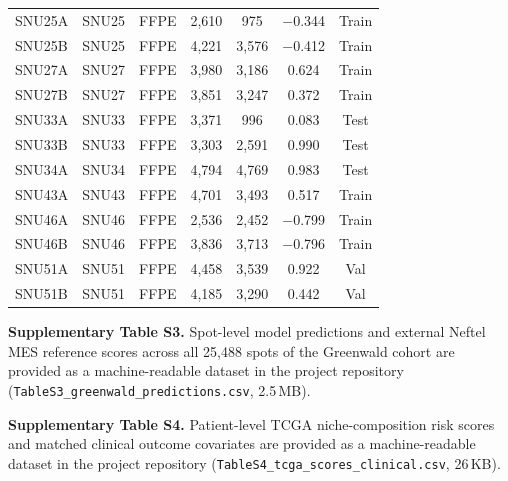 \documentclass[11pt,letterpaper]{article}
\begin{document}
\begin{table}[H]
\begin{tabular}{llccccc}
SNU25A         & SNU25   & FFPE   & 2{,}610 & 975     & $-$0.344 & Train \\
SNU25B         & SNU25   & FFPE   & 4{,}221 & 3{,}576 & $-$0.412 & Train \\
SNU27A         & SNU27   & FFPE   & 3{,}980 & 3{,}186 & 0.624  & Train \\
SNU27B         & SNU27   & FFPE   & 3{,}851 & 3{,}247 & 0.372  & Train \\
SNU33A         & SNU33   & FFPE   & 3{,}371 & 996     & 0.083  & Test \\
SNU33B         & SNU33   & FFPE   & 3{,}303 & 2{,}591 & 0.990  & Test \\
SNU34A         & SNU34   & FFPE   & 4{,}794 & 4{,}769 & 0.983  & Test \\
SNU43A         & SNU43   & FFPE   & 4{,}701 & 3{,}493 & 0.517  & Train \\
SNU46A         & SNU46   & FFPE   & 2{,}536 & 2{,}452 & $-$0.799 & Train \\
SNU46B         & SNU46   & FFPE   & 3{,}836 & 3{,}713 & $-$0.796 & Train \\
SNU51A         & SNU51   & FFPE   & 4{,}458 & 3{,}539 & 0.922  & Val \\
SNU51B         & SNU51   & FFPE   & 4{,}185 & 3{,}290 & 0.442  & Val \\
\bottomrule
\end{tabular}
\end{table}

\vspace{1em}
\noindent\textbf{Supplementary Table S3.} Spot-level model predictions and external Neftel MES reference scores across all 25{,}488 spots of the Greenwald cohort are provided as a machine-readable dataset in the project repository (\texttt{TableS3\_}\allowbreak\texttt{greenwald\_}\allowbreak\texttt{predictions.csv}, 2.5\,MB).

\vspace{0.5em}
\noindent\textbf{Supplementary Table S4.} Patient-level TCGA niche-composition risk scores and matched clinical outcome covariates are provided as a machine-readable dataset in the project repository (\texttt{TableS4\_}\allowbreak\texttt{tcga\_}\allowbreak\texttt{scores\_}\allowbreak\texttt{clinical.csv}, 26\,KB).

\clearpage
\end{document}
